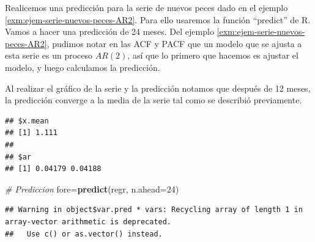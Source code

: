 \documentclass[12pt,]{krantz}
\makeatletter
\newenvironment{Shaded}{\begin{snugshade}}{\end{snugshade}}
\newcommand{\KeywordTok}[1]{\textcolor[rgb]{0.13,0.29,0.53}{\textbf{#1}}}
\newcommand{\DataTypeTok}[1]{\textcolor[rgb]{0.13,0.29,0.53}{#1}}
\newcommand{\DecValTok}[1]{\textcolor[rgb]{0.00,0.00,0.81}{#1}}
\newcommand{\CommentTok}[1]{\textcolor[rgb]{0.56,0.35,0.01}{\textit{#1}}}
\newcommand{\OtherTok}[1]{\textcolor[rgb]{0.56,0.35,0.01}{#1}}
\newcommand{\OperatorTok}[1]{\textcolor[rgb]{0.81,0.36,0.00}{\textbf{#1}}}
\newcommand{\NormalTok}[1]{#1}
\newenvironment{kframe}{%
\medskip{}
\setlength{\fboxsep}{.8em}
 \def\at@end@of@kframe{}%
 \ifinner\ifhmode%
  \def\at@end@of@kframe{\end{minipage}}%
  \begin{minipage}{\columnwidth}%
 \fi\fi%
 \def\FrameCommand##1{\hskip\@totalleftmargin \hskip-\fboxsep
 \colorbox{shadecolor}{##1}\hskip-\fboxsep
     \hskip-\linewidth \hskip-\@totalleftmargin \hskip\columnwidth}%
 \MakeFramed {\advance\hsize-\width
   \@totalleftmargin\z@ \linewidth\hsize
   \@setminipage}}%
 {\par\unskip\endMakeFramed%
 \at@end@of@kframe}
\renewenvironment{Shaded}{\begin{kframe}}{\end{kframe}}
\theoremstyle{definition}
\theoremstyle{definition}
\theoremstyle{definition}
\theoremstyle{remark}
\let\BeginKnitrBlock\begin \let\EndKnitrBlock\end
\makeatother
\begin{document}
\BeginKnitrBlock{example}
\protect\hypertarget{exm:ejem-prediccion-SOI}{}{\label{exm:ejem-prediccion-SOI}
}Realicemos una predicción para la serie de nuevos peces dado en el
ejemplo \ref{exm:ejem-serie-nuevos-peces-AR2}. Para ello usaremos la
función ``predict'' de R. Vamos a hacer una predicción de 24 meses. Del
ejemplo \ref{exm:ejem-serie-nuevos-peces-AR2}, pudimos notar en las ACF
y PACF que un modelo que se ajusta a esta serie es un proceso \(AR(2)\),
así que lo primero que hacemos es ajustar el modelo, y luego calculamos
la predicción.

Al realizar el gráfico de la serie y la predicción notamos que después
de 12 meses, la predicción converge a la media de la serie tal como se
describió previamente.
\EndKnitrBlock{example}

\begin{Shaded}
\end{Shaded}

\begin{verbatim}
## $x.mean
## [1] 1.111
## 
## $ar
## [1] 0.04179 0.04188
\end{verbatim}

\begin{Shaded}
\begin{Highlighting}[]
\CommentTok{# Prediccion}
\NormalTok{fore=}\KeywordTok{predict}\NormalTok{(regr, }\DataTypeTok{n.ahead=}\DecValTok{24}\NormalTok{)}
\end{Highlighting}
\end{Shaded}

\begin{verbatim}
## Warning in object$var.pred * vars: Recycling array of length 1 in array-vector arithmetic is deprecated.
##   Use c() or as.vector() instead.
\end{verbatim}
\end{document}
